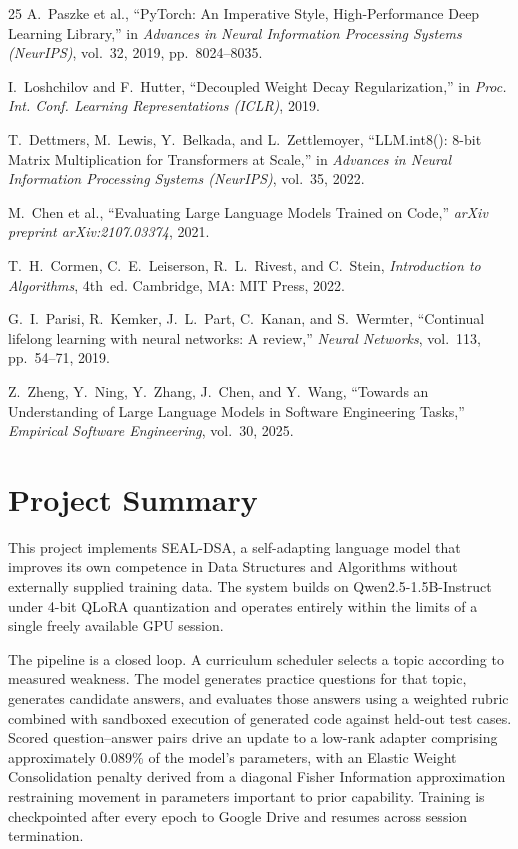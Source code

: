 \documentclass[12pt,a4paper]{report}
\begin{document}
\begin{thebibliography}{25}
A.~Paszke et al., ``PyTorch: An Imperative Style, High-Performance Deep Learning Library,'' in \textit{Advances in Neural Information Processing Systems (NeurIPS)}, vol.~32, 2019, pp.~8024--8035.

I.~Loshchilov and F.~Hutter, ``Decoupled Weight Decay Regularization,'' in \textit{Proc. Int. Conf. Learning Representations (ICLR)}, 2019.

T.~Dettmers, M.~Lewis, Y.~Belkada, and L.~Zettlemoyer, ``LLM.int8(): 8-bit Matrix Multiplication for Transformers at Scale,'' in \textit{Advances in Neural Information Processing Systems (NeurIPS)}, vol.~35, 2022.

M.~Chen et al., ``Evaluating Large Language Models Trained on Code,'' \textit{arXiv preprint arXiv:2107.03374}, 2021.

T.~H.~Cormen, C.~E.~Leiserson, R.~L.~Rivest, and C.~Stein, \textit{Introduction to Algorithms}, 4th~ed. Cambridge, MA: MIT Press, 2022.

G.~I.~Parisi, R.~Kemker, J.~L.~Part, C.~Kanan, and S.~Wermter, ``Continual lifelong learning with neural networks: A review,'' \textit{Neural Networks}, vol.~113, pp.~54--71, 2019.

Z.~Zheng, Y.~Ning, Y.~Zhang, J.~Chen, and Y.~Wang, ``Towards an Understanding of Large Language Models in Software Engineering Tasks,'' \textit{Empirical Software Engineering}, vol.~30, 2025.

\end{thebibliography}

\chapter*{Project Summary}

This project implements SEAL-DSA, a self-adapting language model that improves its own competence in Data Structures and Algorithms without externally supplied training data. The system builds on Qwen2.5-1.5B-Instruct under 4-bit QLoRA quantization and operates entirely within the limits of a single freely available GPU session.

The pipeline is a closed loop. A curriculum scheduler selects a topic according to measured weakness. The model generates practice questions for that topic, generates candidate answers, and evaluates those answers using a weighted rubric combined with sandboxed execution of generated code against held-out test cases. Scored question--answer pairs drive an update to a low-rank adapter comprising approximately 0.089\% of the model's parameters, with an Elastic Weight Consolidation penalty derived from a diagonal Fisher Information approximation restraining movement in parameters important to prior capability. Training is checkpointed after every epoch to Google Drive and resumes across session termination.
\end{document}
